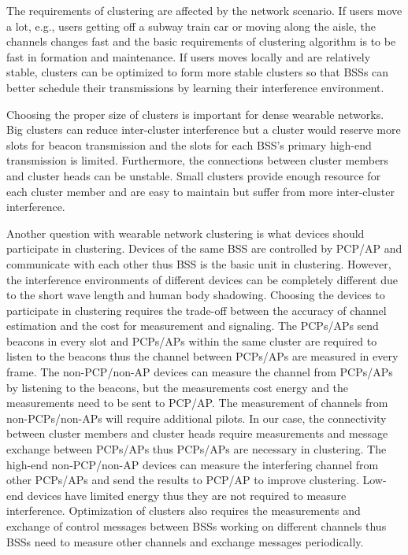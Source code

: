 \documentclass[10pt, conference, letterpaper]{IEEEtran}
\begin{document}
The requirements of clustering are affected by the network scenario. If users move a lot, e.g., users getting off a subway train car or moving along the aisle, the channels changes fast and the basic requirements of clustering algorithm is to be fast in formation and maintenance. If users moves locally and are relatively stable, clusters can be optimized to form more stable clusters so that BSSs can better schedule their transmissions by learning their interference environment. 

Choosing the proper size of clusters is important for dense wearable networks. Big clusters can reduce inter-cluster interference but a cluster would reserve more slots for beacon transmission and the slots for each BSS's primary high-end transmission is limited. Furthermore, the connections between cluster members and cluster heads can be unstable. 
Small clusters provide enough resource for each cluster member and are easy to maintain but suffer from more inter-cluster interference.

Another question with wearable network clustering is what devices should participate in clustering. Devices of the same BSS are controlled by PCP/AP and communicate with each other thus BSS is the basic unit in clustering. However, the interference environments of different devices can be completely different due to the short wave length and human body shadowing. Choosing the devices to participate in clustering requires the trade-off between the accuracy of channel estimation and the cost for measurement and signaling. 
The PCPs/APs send beacons in every slot and PCPs/APs within the same cluster are required to listen to the beacons thus the channel between PCPs/APs are measured in every frame. The non-PCP/non-AP devices can measure the channel from PCPs/APs by listening to the beacons, but the measurements cost energy and the measurements need to be sent to PCP/AP. The measurement of channels from non-PCPs/non-APs will require additional pilots. In our case, the connectivity between cluster members and cluster heads require measurements and message exchange between PCPs/APs thus PCPs/APs are necessary in clustering. The high-end non-PCP/non-AP devices can measure the interfering channel from other PCPs/APs and send the results to PCP/AP to improve clustering. Low-end devices have limited energy thus they are not required to measure interference. %
Optimization of clusters also requires the measurements and exchange of control messages between BSSs working on different channels thus BSSs need to measure other channels and exchange messages periodically. 
\end{document}
